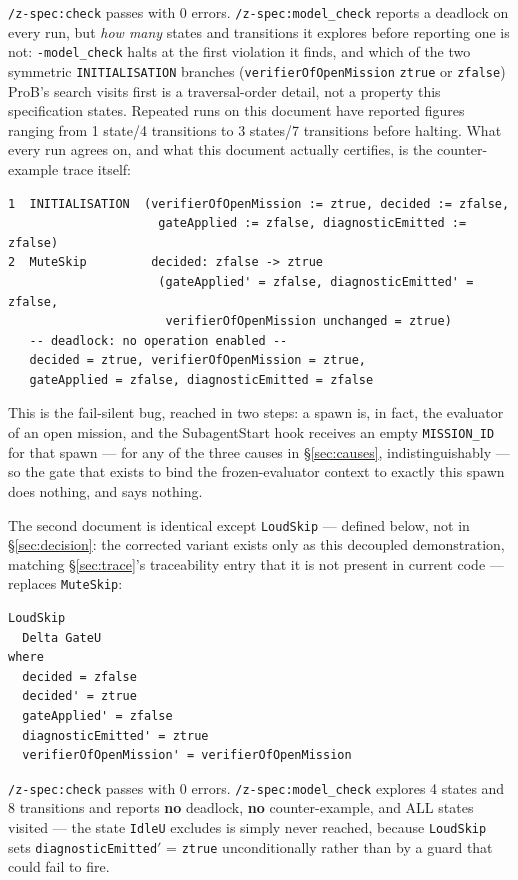 \documentclass[a4paper,10pt,fleqn]{article}
\newcommand{\field}[1]{\texttt{#1}}
\begin{document}
\texttt{/z-spec:check} passes with 0 errors. \texttt{/z-spec:model\_check}
reports a deadlock on every run, but \emph{how many} states and
transitions it explores before reporting one is not: \field{-model\_check}
halts at the first violation it finds, and which of the two symmetric
\field{INITIALISATION} branches (\field{verifierOfOpenMission} \field{ztrue}
or \field{zfalse}) ProB's search visits first is a traversal-order detail,
not a property this specification states. Repeated runs on this
document have reported figures ranging from 1 state/4 transitions to
3 states/7 transitions before halting. What every run agrees on, and
what this document actually certifies, is the counter-example trace
itself:

\begin{verbatim}
1  INITIALISATION  (verifierOfOpenMission := ztrue, decided := zfalse,
                     gateApplied := zfalse, diagnosticEmitted := zfalse)
2  MuteSkip         decided: zfalse -> ztrue
                     (gateApplied' = zfalse, diagnosticEmitted' = zfalse,
                      verifierOfOpenMission unchanged = ztrue)
   -- deadlock: no operation enabled --
   decided = ztrue, verifierOfOpenMission = ztrue,
   gateApplied = zfalse, diagnosticEmitted = zfalse
\end{verbatim}

This is the fail-silent bug, reached in two steps: a spawn is, in
fact, the evaluator of an open mission, and the SubagentStart hook
receives an empty \field{MISSION\_ID} for that spawn --- for any of
the three causes in \S\ref{sec:causes}, indistinguishably --- so the
gate that exists to bind the frozen-evaluator context to exactly this
spawn does nothing, and says nothing.

The second document is identical except \field{LoudSkip} ---
defined below, not in \S\ref{sec:decision}: the corrected variant
exists only as this decoupled demonstration, matching
\S\ref{sec:trace}'s traceability entry that it is not present in
current code --- replaces \field{MuteSkip}:

\begin{verbatim}
LoudSkip
  Delta GateU
where
  decided = zfalse
  decided' = ztrue
  gateApplied' = zfalse
  diagnosticEmitted' = ztrue
  verifierOfOpenMission' = verifierOfOpenMission
\end{verbatim}

\texttt{/z-spec:check} passes with 0 errors.
\texttt{/z-spec:model\_check} explores 4 states and 8 transitions and
reports \textbf{no} deadlock, \textbf{no} counter-example, and ALL
states visited --- the state \field{IdleU} excludes is simply never
reached, because \field{LoudSkip} sets
\field{diagnosticEmitted}$'$ = \field{ztrue} unconditionally rather
than by a guard that could fail to fire.
\end{document}
